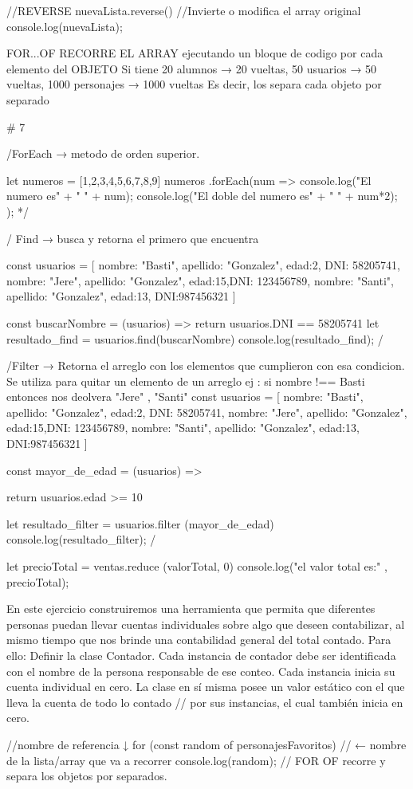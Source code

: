 //REVERSE
nuevaLista.reverse() //Invierte o modifica el array original
console.log(nuevaLista);

FOR...OF
RECORRE EL ARRAY ejecutando un bloque de codigo por cada elemento del OBJETO
Si tiene 20 alumnos → 20 vueltas, 50 usuarios → 50 vueltas, 1000 personajes → 1000 vueltas
Es decir, los separa cada objeto por separado

# 7

/\*ForEach → metodo de orden superior.

let numeros = [1,2,3,4,5,6,7,8,9]
numeros .forEach(num => {
console.log("El numero es" + " " + num);
console.log("El doble del numero es" + " " + num*2);
});
*/

/\* Find → busca y retorna el primero que encuentra

const usuarios = [
{nombre: "Basti", apellido: "Gonzalez", edad:2, DNI: 58205741},
{nombre: "Jere", apellido: "Gonzalez", edad:15,DNI: 123456789},
{nombre: "Santi", apellido: "Gonzalez", edad:13, DNI:987456321}
]

const buscarNombre = (usuarios) =>{
return usuarios.DNI == 58205741
}
let resultado_find = usuarios.find(buscarNombre)
console.log(resultado_find);
\*/

/\*Filter → Retorna el arreglo con los elementos que cumplieron con esa condicion.
Se utiliza para quitar un elemento de un arreglo ej : si nombre !== Basti entonces nos deolvera "Jere" , "Santi"
const usuarios = [
{nombre: "Basti", apellido: "Gonzalez", edad:2, DNI: 58205741},
{nombre: "Jere", apellido: "Gonzalez", edad:15,DNI: 123456789},
{nombre: "Santi", apellido: "Gonzalez", edad:13, DNI:987456321}
]

const mayor_de_edad = (usuarios) =>{

    return usuarios.edad >= 10

}

let resultado_filter = usuarios.filter (mayor_de_edad)
console.log(resultado_filter);
\*/

let precioTotal = ventas.reduce (valorTotal, 0)
console.log("el valor total es:" , precioTotal);

En este ejercicio construiremos una herramienta que permita que diferentes personas puedan
llevar cuentas individuales sobre algo que deseen contabilizar, al mismo tiempo que nos brinde una contabilidad
general del total contado. Para ello:
Definir la clase Contador.
Cada instancia de contador debe ser identificada con el nombre de la persona responsable de ese conteo.
Cada instancia inicia su cuenta individual en cero.
La clase en sí misma posee un valor estático con el que lleva la cuenta de todo lo contado
// por sus instancias, el cual también inicia en cero.


//nombre de referencia ↓  
for (const random of personajesFavoritos) // ← nombre de la lista/array que va a recorrer
{
console.log(random);
}
// FOR OF recorre y separa los objetos por separados.
